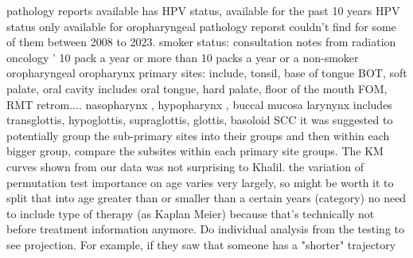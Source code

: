 \documentclass{article}%
\begin{document}
%
pathology reports available has HPV status, available for the past 10 years %
\newline%
\newline%
%
HPV status only available for oropharyngeal %
\newline%
\newline%
%
pathology reporst couldn't find for some of them between 2008 to 2023. %
\newline%
\newline%
%
smoker status: consultation notes from radiation oncology %
\newline%
\newline%
%
' 10 pack a year or more than 10 packs a year or a non{-}smoker %
\newline%
\newline%
%
oropharyngeal oropharynx primary sites: include, tonsil, base of tongue BOT, soft palate, %
\newline%
\newline%
%
oral cavity includes oral tongue, hard palate, floor of the mouth FOM, RMT retrom....%
\newline%
\newline%
%
nasopharynx , hypopharynx , buccal mucosa%
\newline%
\newline%
%
larynynx includes transglottis, hypoglottis, supraglottis, glottis, basoloid SCC %
\newline%
\newline%
%
it was suggested to potentially group the sub{-}primary sites into their groups and then within each bigger group, compare the subsites within each primary site groups. %
\newline%
\newline%
%
The KM curves shown from our data was not surprising to Khalil.%
\newline%
\newline%
%
the variation of permutation test importance on age varies very largely, so might be worth it to split that into age greater than or smaller than a certain years (category) %
\newline%
\newline%
%
no need to include type of therapy (as Kaplan Meier) because that's technically not before treatment information anymore. %
\newline%
\newline%
%
Do individual analysis from the testing to see projection. For example, if they saw that someone has a "shorter" trajectory %
\end{document}

